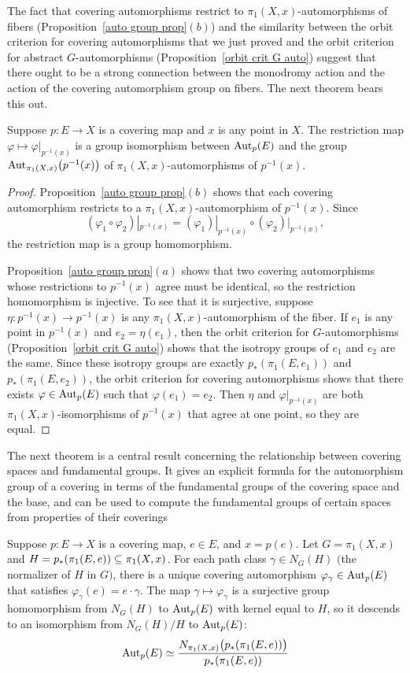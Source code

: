The fact that covering automorphisms restrict to $\pi_1(X,x)$-automorphisms of fibers (Proposition~\ref{auto group prop}$(b)$) and the similarity between the orbit criterion for covering automorphisms that we just proved and the orbit criterion for abstract $G$-automorphisms (Proposition~\ref{orbit crit G auto}) suggest that there ought to be a strong connection between the monodromy action and the action of the covering automorphism group on fibers. The next theorem bears this out.
\begin{theorem}\label{cover auto G auto}
Suppose $p:E\to X$ is a covering map and $x$ is any point in $X$. The
restriction map $\varphi\mapsto\varphi|_{p^{-1}(x)}$ is a group isomorphism between $\mathrm{Aut}_p(E)$ and the group $\mathrm{Aut}_{\pi_1(X,x)}\big(p^{-1}(x)\big)$ of $\pi_1(X,x)$-automorphisms of $p^{-1}(x)$.
\end{theorem}
\begin{proof}
Proposition~\ref{auto group prop}$(b)$ shows that each covering automorphism restricts to a $\pi_1(X,x)$-automorphism of $p^{-1}(x)$. Since 
\[(\varphi_1\circ\varphi_2)|_{p^{-1}(x)}=(\varphi_1)|_{p^{-1}(x)}\circ(\varphi_2)|_{p^{-1}(x)},\]
the restriction map is a group homomorphism.\par
Proposition~\ref{auto group prop}$(a)$ shows that two covering automorphisms whose restrictions to $p^{-1}(x)$ agree must be identical, so the restriction homomorphism is injective. To see that it is surjective, suppose $\eta:p^{-1}(x)\to p^{-1}(x)$ is any $\pi_1(X,x)$-automorphism of the fiber. If $e_1$ is any point in $p^{-1}(x)$ and $e_2=\eta(e_1)$, then the orbit criterion for $G$-automorphisms (Proposition~\ref{orbit crit G auto}) shows that the isotropy groups of $e_1$ and $e_2$ are the same. Since these isotropy groups are exactly $p_*(\pi_1(E,e_1))$ and $p_*(\pi_1(E,e_2))$, the orbit criterion for covering automorphisms shows that there exists $\varphi\in\mathrm{Aut}_p(E)$ such that $\varphi(e_1)=e_2$. Then $\eta$ and $\varphi|_{p^{-1}(x)}$ are both $\pi_1(X,x)$-isomorphisms of $p^{-1}(x)$ that agree at one point, so they are equal.
\end{proof}
The next theorem is a central result concerning the relationship between covering spaces and fundamental groups. It gives an explicit formula for the automorphism group of a covering in terms of the fundamental groups of the covering space and the base, and can be used to compute the fundamental groups of certain spaces from properties of their coverings
\begin{theorem}\label{cover auto structure}
Suppose $p:E\to X$ is a covering map, $e\in E$, and $x=p(e)$. Let $G=\pi_1(X,x)$ and $H=p_*(\pi_1(E,e))\subseteq\pi_1(X,x)$. For each path class $\gamma\in N_G(H)$ $($the normalizer of $H$ in $G$$)$, there is a unique covering automorphism $\varphi_\gamma\in\mathrm{Aut}_p(E)$ that satisfies $\varphi_\gamma(e)=e\cdot\gamma$. The map $\gamma\mapsto\varphi_\gamma$ is a surjective group homomorphism from $N_G(H)$ to $\mathrm{Aut}_p(E)$ with kernel equal to $H$, so it descends to an isomorphism from $N_G(H)/H$ to $\mathrm{Aut}_p(E)$:
\[\mathrm{Aut}_p(E)\simeq\dfrac{N_{\pi_1(X,x)}\big(p_*(\pi_1(E,e))\big)}{p_*(\pi_1(E,e))}\]
\end{theorem}
